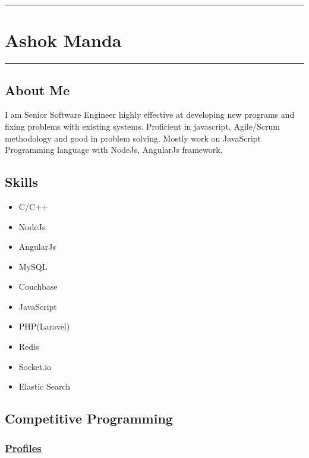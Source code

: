 \begin{center}\rule{3in}{0.4pt}\end{center}

\section{Ashok Manda}

\begin{center}\rule{3in}{0.4pt}\end{center}

\subsection{About Me}

I am Senior Software Engineer highly effective at developing new
programs and fixing problems with existing systems. Proficient in
javascript, Agile/Scrum methodology and good in problem solving. Mostly
work on JavaScript Programming language with NodeJs, AngularJs
framework.

\subsection{Skills}

\begin{itemize}
\itemsep1pt\parskip0pt
\item
  C/C++
\item
  NodeJs
\item
  AngularJs
\item
  MySQL
\item
  Couchbase
\item
  JavaScript
\item
  PHP(Laravel)
\item
  Redis
\item
  Socket.io
\item
  Elastic Search
\end{itemize}

\subsection{Competitive Programming}

\subsubsection{\href{http://en.wikipedia.org/wiki/Competitive_programming\#Online_contest_and_training_resources}{Profiles}}


